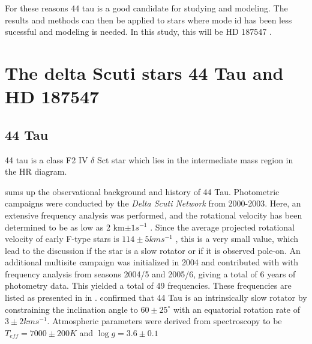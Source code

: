 For these reasons 44 tau is a good candidate for studying and modeling. The results and methods can then be applied to stars where mode id has been less sucessful and modeling is needed. In this study, this will be HD 187547 \citet{antoci2014role}. 

\section{The delta Scuti stars 44 Tau and HD 187547}

\subsection{44 Tau}

44 tau is a class F2 IV $\delta$ Sct star which lies in the intermediate mass region in the HR diagram. 

\citet{antoci200744} sums up the observational background and history of 44 Tau. Photometric campaigns were conducted by the \textit{Delta Scuti Network} from 2000-2003. Here, an extensive frequency analysis was performed, and the rotational velocity has been determined to be as low as 2 km$ \pm 1 s^{-1}$ \citep{lenz2008asteroseismic}. Since the average projected rotational velocity of early F-type stars is $114 \pm 5 km s^{-1}$ \citep{royer2004rotational}, this is a very small value, which lead to the discussion if the star is a slow rotator or if it is observed pole-on\citep{antoci200744}. 
 An additional multisite campaign  was initialized in 2004 \citep{zima2007high} and \citet{breger2008A&A} contributed with with frequency analysis from seasons  2004/5 and 2005/6, giving a total of 6 years of photometry data. This yielded a total of 49 frequencies. These frequencies are listed as presented in \citep{lenz2010delta} in . \citet{zima2007high} confirmed that 44 Tau is an intrinsically slow rotator by constraining the inclination angle to $60 \pm 25^{\circ}$ with an equatorial rotation rate of $3 \pm 2 km s^{-1}$. Atmospheric parameters were derived from spectroscopy to be  $T_{eff} = 7000\pm200 K$ and $\log g = 3.6\pm0.1$

